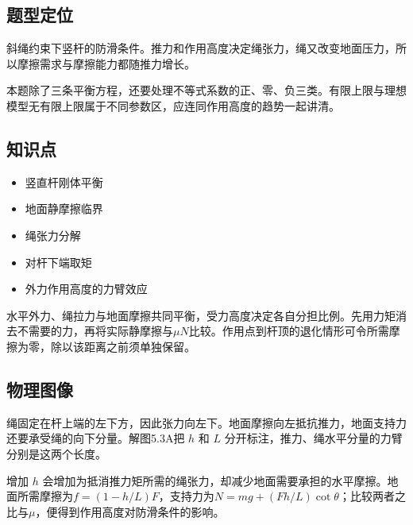 \documentclass[UTF8,fontset=fandol,a4paper,11pt]{ctexart}
\providecommand{\tightlist}{\setlength{\itemsep}{0pt}\setlength{\parskip}{0pt}}
\begin{document}


\subsection*{题型定位}

斜绳约束下竖杆的防滑条件。推力和作用高度决定绳张力，绳又改变地面压力，所以摩擦需求与摩擦能力都随推力增长。

本题除了三条平衡方程，还要处理不等式系数的正、零、负三类。有限上限与理想模型无有限上限属于不同参数区，应连同作用高度的趋势一起讲清。



\subsection*{知识点}

\begin{itemize}
\tightlist
\item
  竖直杆刚体平衡
\item
  地面静摩擦临界
\item
  绳张力分解
\item
  对杆下端取矩
\item
  外力作用高度的力臂效应
\end{itemize}

水平外力、绳拉力与地面摩擦共同平衡，受力高度决定各自分担比例。先用力矩消去不需要的力，再将实际静摩擦与$\mu N$比较。作用点到杆顶的退化情形可令所需摩擦为零，除以该距离之前须单独保留。




\subsection*{物理图像}

绳固定在杆上端的左下方，因此张力向左下。地面摩擦向左抵抗推力，地面支持力还要承受绳的向下分量。解图5.3A把 $h$ 和 $L$ 分开标注，推力、绳水平分量的力臂分别是这两个长度。

增加 $h$ 会增加为抵消推力矩所需的绳张力，却减少地面需要承担的水平摩擦。地面所需摩擦为$f=(1-h/L)F$，支持力为$N=mg+(Fh/L)\cot\theta$；比较两者之比与$\mu$，便得到作用高度对防滑条件的影响。

\end{document}
